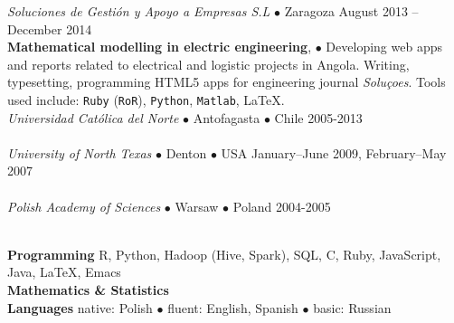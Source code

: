 \documentclass[a4paper, oneside]{scrreprt}
\begin{document}
\noindent{}\textit{Soluciones de Gestión y Apoyo a Empresas S.L} 
$\bullet$ Zaragoza  \hfill August 2013 -- December 2014\\
\noindent\textbf{\small Mathematical modelling in electric engineering}, $\bullet$ 
{\small Developing web apps and reports related to electrical and
  logistic projects in Angola.  Writing, typesetting, programming
  HTML5 apps for engineering journal \emph{Soluçoes}.  Tools used
  include:
  \texttt{Ruby} (\texttt{RoR}), \texttt{Python}, \texttt{Matlab}, \LaTeX.}\\

\noindent{}\textit{Universidad Católica del Norte} $\bullet$ 
Antofagasta $\bullet$ Chile \hfill 2005-2013\\
\\

\noindent{}\textit{University of North Texas} $\bullet$ Denton $\bullet$ USA \hfill January–June 2009, February–May 2007\\
\\


\noindent{}\textit{Polish Academy of Sciences} $\bullet$ 
Warsaw $\bullet$ Poland \hfill 2004-2005\\
\\


\noindent\makebox[\linewidth]{\rule{\textwidth}{0.4pt}}

\vspace{0.6cm}

\noindent\llap{\FA \faKeyboardO\ \ } \textbf{Programming} R, Python, Hadoop (Hive, Spark), SQL, C, Ruby, JavaScript, Java, \LaTeX, Emacs \\
\noindent\llap{\FA \faSuperscript\ \ } \textbf{Mathematics \& Statistics} \\
\noindent\llap{\FA \faComments\ \ } \textbf{Languages} native: Polish $\bullet$ fluent: English, Spanish $\bullet$ basic: Russian \\
\ \\
\ \\
\end{document}
